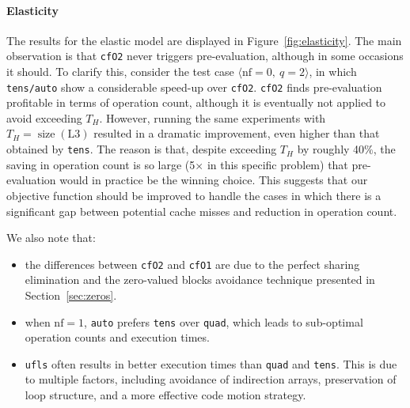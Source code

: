 \paragraph{Elasticity}
The results for the elastic model are displayed in Figure~\ref{fig:elasticity}. The main observation is that \texttt{cfO2} never triggers pre-evaluation, although in some occasions it should. To clarify this, consider the test case $\langle \mathrm{nf}=0,\ q=2 \rangle$, in which \texttt{tens/auto} show a considerable speed-up over \texttt{cfO2}. \texttt{cfO2} finds pre-evaluation profitable in terms of operation count, although it is eventually not applied to avoid exceeding $T_H$. However, running the same experiments with $T_H = \operatorname{size}(\mathrm{L3})$ resulted in a dramatic improvement, even higher than that obtained by \texttt{tens}. The reason is that, despite exceeding $T_H$ by roughly 40$\%$, the saving in operation count is so large (5$\times$ in this specific problem) that pre-evaluation would in practice be the winning choice. This suggests that our objective function should be improved to handle the cases in which there is a significant gap between potential cache misses and reduction in operation count.

We also note that:
\begin{itemize}
\item the differences between \texttt{cfO2} and \texttt{cfO1} are due to the perfect sharing elimination and the zero-valued blocks avoidance technique presented in Section~\ref{sec:zeros}.
\item when $\mathrm{nf}=1$, \texttt{auto} prefers \texttt{tens} over \texttt{quad}, which leads to sub-optimal operation counts and execution times.
\item \texttt{ufls} often results in better execution times than \texttt{quad} and \texttt{tens}. This is due to multiple factors, including avoidance of indirection arrays, preservation of loop structure, and a more effective code motion strategy.
\end{itemize}

